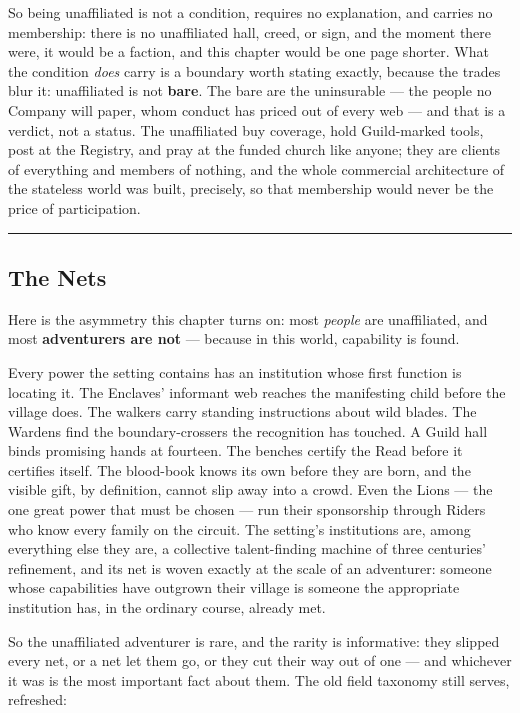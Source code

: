 So being unaffiliated is not a condition, requires no explanation, and carries no membership: there is no unaffiliated hall, creed, or sign, and the moment there were, it would be a faction, and this chapter would be one page shorter. What the condition \textit{does} carry is a boundary worth stating exactly, because the trades blur it: unaffiliated is not \textbf{bare}. The bare are the uninsurable --- the people no Company will paper, whom conduct has priced out of every web --- and that is a verdict, not a status. The unaffiliated buy coverage, hold Guild-marked tools, post at the Registry, and pray at the funded church like anyone; they are clients of everything and members of nothing, and the whole commercial architecture of the stateless world was built, precisely, so that membership would never be the price of participation.

\medskip\hrule\medskip

\subsection{The Nets}

Here is the asymmetry this chapter turns on: most \textit{people} are unaffiliated, and most \textbf{adventurers are not} --- because in this world, capability is found.

Every power the setting contains has an institution whose first function is locating it. The Enclaves' informant web reaches the manifesting child before the village does. The walkers carry standing instructions about wild blades. The Wardens find the boundary-crossers the recognition has touched. A Guild hall binds promising hands at fourteen. The benches certify the Read before it certifies itself. The blood-book knows its own before they are born, and the visible gift, by definition, cannot slip away into a crowd. Even the Lions --- the one great power that must be chosen --- run their sponsorship through Riders who know every family on the circuit. The setting's institutions are, among everything else they are, a collective talent-finding machine of three centuries' refinement, and its net is woven exactly at the scale of an adventurer: someone whose capabilities have outgrown their village is someone the appropriate institution has, in the ordinary course, already met.

So the unaffiliated adventurer is rare, and the rarity is informative: they slipped every net, or a net let them go, or they cut their way out of one --- and whichever it was is the most important fact about them. The old field taxonomy still serves, refreshed:


